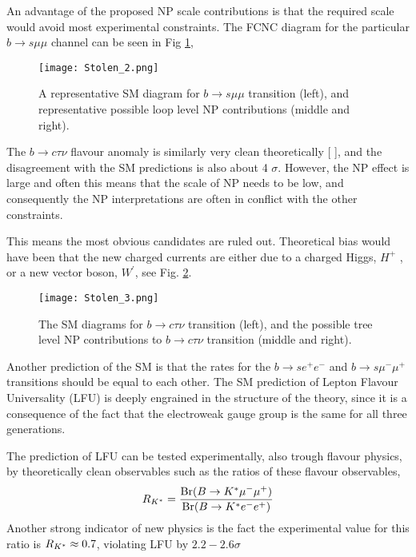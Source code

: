 An advantage of the proposed NP scale contributions is that the required scale would avoid most experimental constraints. The FCNC diagram for the particular $b \rightarrow s \mu \mu$ channel can be seen in Fig \ref{fig:FlavourMuon}, 

\begin{figure}[H]
	\centering
	\texttt{[image: Stolen\_2.png]}
	\caption{A representative SM diagram for $b \rightarrow s \mu \mu$ transition (left), and representative possible loop level NP
contributions (middle and right).}
	\label{fig:FlavourMuon}
\end{figure}

The $b \rightarrow c \tau \nu$ flavour anomaly is similarly very clean theoretically [
], and the disagreement with the
SM predictions is also about 4 $\sigma$. However, the NP effect is large and often this means that the scale of NP needs to be low, and consequently the NP interpretations are often in conflict with the other constraints.

This means the most obvious candidates are ruled out. Theoretical bias would have been that the new charged currents are either due to a charged Higgs, $H^+$ , or a new vector boson, $W^\prime$, see Fig. \ref{fig:FlavourTau}.

\begin{figure}[H]	
	\centering
	\texttt{[image: Stolen\_3.png]}
	\caption{The SM diagrams for $b \rightarrow c \tau \nu$ transition (left), and the possible tree level NP contributions to $b \rightarrow c \tau \nu$ transition (middle and right).}
	\label{fig:FlavourTau}
\end{figure}

Another prediction of the SM is that the rates for the  $b \rightarrow s e^+ e^-$ and  $b \rightarrow s \mu^- \mu^+$ transitions should be equal to each other. The SM prediction of Lepton Flavour Universality (LFU) is deeply engrained in the structure of the theory, since it is a consequence of the fact that the electroweak gauge group is the same for all three generations. 

The prediction of LFU can be tested experimentally, also trough flavour physics, by theoretically clean observables such as the ratios of these flavour observables, 
%
\begin{equation}
R_{K^{\**}} = \frac{\text{Br}( B \rightarrow K^{\**} \mu^- \mu^+ )}{\text{Br} (  B \rightarrow K^{\**} e^- e^+  )}
\end{equation}
% 
Another strong indicator of new physics is the fact the experimental value for this ratio is $R_{K^{\**}} \approx 0.7$, violating LFU by $2.2 - 2.6 \sigma$

